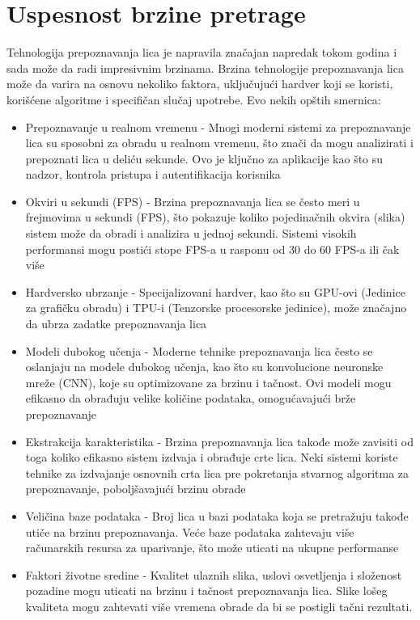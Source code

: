 \documentclass[a4paper]{article}
\begin{document}
\section{Uspesnost brzine pretrage}
\label{sec:brzina pretrage}
Tehnologija prepoznavanja lica je napravila značajan napredak tokom godina i sada može da radi impresivnim brzinama. Brzina tehnologije prepoznavanja lica može da varira na osnovu nekoliko faktora, uključujući hardver koji se koristi, korišćene algoritme i specifičan slučaj upotrebe. Evo nekih opštih smernica:
\begin{itemize}
\item Prepoznavanje u realnom vremenu - Mnogi moderni sistemi za prepoznavanje lica su sposobni za obradu u realnom vremenu, što znači da mogu analizirati i prepoznati lica u deliću sekunde. Ovo je ključno za aplikacije kao što su nadzor, kontrola pristupa i autentifikacija korisnika
\item Okviri u sekundi (FPS) - Brzina prepoznavanja lica se često meri u frejmovima u sekundi  (FPS), što pokazuje koliko pojedinačnih okvira (slika) sistem može da obradi i analizira u jednoj sekundi. Sistemi visokih performansi mogu postići stope FPS-a u rasponu od 30 do 60 FPS-a ili čak više
\item   Hardversko ubrzanje - Specijalizovani hardver, kao što su GPU-ovi (Jedinice za grafičku obradu) i TPU-i (Tenzorske procesorske jedinice), može značajno da ubrza zadatke prepoznavanja lica 
\item Modeli dubokog učenja - Moderne tehnike prepoznavanja lica često se oslanjaju na modele dubokog učenja, kao što su konvolucione neuronske mreže (CNN), koje su optimizovane za brzinu i tačnost. Ovi modeli mogu efikasno da obrađuju velike količine podataka, omogućavajući brže prepoznavanje
\item Ekstrakcija karakteristika - Brzina prepoznavanja lica takođe može zavisiti od toga koliko efikasno sistem izdvaja i obrađuje crte lica. Neki sistemi koriste tehnike za izdvajanje osnovnih crta lica pre pokretanja stvarnog algoritma za prepoznavanje, poboljšavajući brzinu obrade
\item Veličina baze podataka -  Broj lica u bazi podataka koja se pretražuju takođe utiče na brzinu prepoznavanja. Veće baze podataka zahtevaju više računarskih resursa za uparivanje, što može uticati na ukupne performanse
\item Faktori životne sredine -  Kvalitet ulaznih slika, uslovi osvetljenja i složenost pozadine mogu uticati na brzinu i tačnost prepoznavanja lica. Slike lošeg kvaliteta mogu zahtevati više vremena obrade da bi se postigli tačni rezultati.
\end{itemize}  
\end{document}
